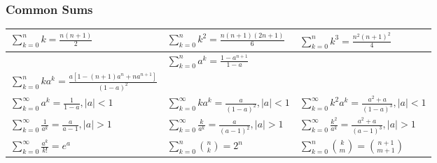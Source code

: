 \documentclass[twoside]{article}
\renewcommand{\arraystretch}{1.5} %
\begin{document}
\subsubsection*{Common Sums}
\vspace{1em}
\sffamily
\bgroup
\def\arraystretch{3}
{\normalsize
  \begin{center}
    \begin{tabular}{| >{\centering}m{5cm}| >{\centering}m{5cm}| >{\centering}m{5cm}|}
      \hline
      $\sum_{k = 0}^n k = \frac{n(n + 1)}{2}$
       &
      $\sum_{k = 0}^n k^2 = \frac{n(n + 1)(2n + 1)}{6}$
       &
      $\sum_{k = 0}^n k^3 = \frac{n^2(n + 1)^2}{4}$
      \tabularnewline \hline
      \multicolumn{2}{|c|}{$\sum_{k = 0}^n k^4 = \frac{n}{30} (n + 1)(2n + 1)(3n^2 + 3n - 1)$}
       &
      $\sum_{k = 0}^n a^k = \frac{1 - a^{n + 1}}{1 - a}$
      \tabularnewline \hline
      $\sum_{k = 0}^n ka^k = \frac{a[1 - (n + 1)a^n + na^{n + 1}]}{(1 - a)^2}$
       &
      \multicolumn{2}{c|}{
      $\sum_{k = 0}^n k^2a^k = \frac{a[(1 + a) - (n + 1)^2a^n + (2n^2 + 2n - 1)a^{n + 1} - n^2a^{n + 2}]}{(1 - a)^3}$
      }
      \tabularnewline \hline
      $\sum_{k = 0}^\infty a^k = \frac{1}{1 - a}, |a| < 1$
       &
      $\sum_{k = 0}^\infty ka^k = \frac{a}{(1 - a)^2}, |a| < 1$
       &
      $\sum_{k = 0}^\infty k^2a^k = \frac{a^2 + a}{(1 - a)^3}, |a| < 1$
      \tabularnewline \hline
      $\sum_{k = 0}^\infty \frac{1}{a^k} = \frac{a}{a - 1}, |a| > 1$
       &
      $\sum_{k = 0}^\infty \frac{k}{a^k} = \frac{a}{(a - 1)^2}, |a| > 1$
       &
      $\sum_{k = 0}^\infty \frac{k^2}{a^k} = \frac{a^2 + a}{(a - 1)^3}, |a| > 1$
      \tabularnewline \hline
      $\sum_{k = 0}^\infty \frac{a^k}{k!} = e^a$
       &
      $\sum_{k = 0}^n \binom{n}{k} = 2^n$
       &
      $\sum_{k = 0}^n \binom{k}{m} = \binom{n + 1}{m + 1}$
      \tabularnewline \hline
    \end{tabular}
  \end{center}
}
\egroup
\vspace{1em}
\begin{multicols*}{2}
\end{multicols*}
\subsubsectionfont{\large\bfseries\sffamily\underline}
\end{document}
